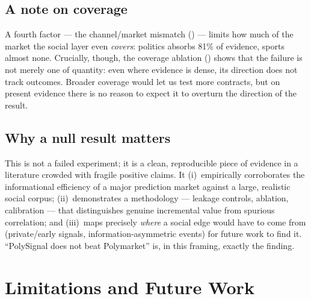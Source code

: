 \section{A note on coverage}
A fourth factor --- the channel/market mismatch () --- limits how
much of the market the social layer even \emph{covers}: politics absorbs 81\% of
evidence, sports almost none. Crucially, though, the coverage ablation
() shows that the failure is not merely one of quantity: even where
evidence is dense, its direction does not track outcomes. Broader coverage would let us
test more contracts, but on present evidence there is no reason to expect it to overturn
the direction of the result.

\section{Why a null result matters}
This is not a failed experiment; it is a clean, reproducible piece of evidence in a
literature crowded with fragile positive claims. It (i)~empirically corroborates the
informational efficiency of a major prediction market against a large, realistic social
corpus; (ii)~demonstrates a methodology --- leakage controls, ablation, calibration ---
that distinguishes genuine incremental value from spurious correlation; and (iii)~maps
precisely \emph{where} a social edge would have to come from (private/early signals,
information-asymmetric events) for future work to find it. ``PolySignal does not beat
Polymarket'' is, in this framing, exactly the finding.


\chapter{Limitations and Future Work}
\label{ch:limitations}

